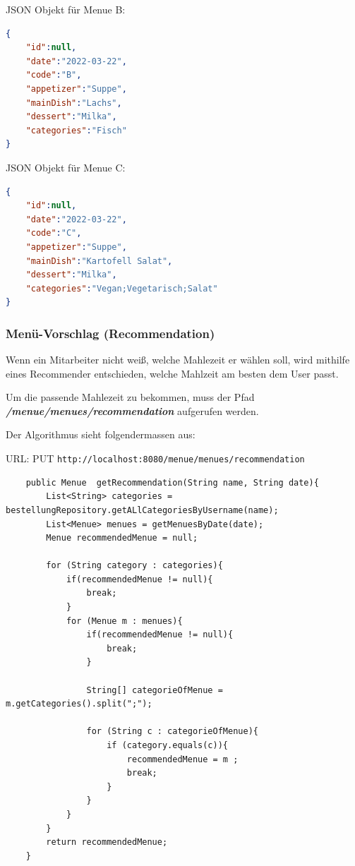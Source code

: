 JSON Objekt für Menue B:

\begin{lstlisting}[language=json,firstnumber=1]
{
    "id":null,
    "date":"2022-03-22",
    "code":"B",
    "appetizer":"Suppe",
    "mainDish":"Lachs",
    "dessert":"Milka",
    "categories":"Fisch"
}
\end{lstlisting}

JSON Objekt für Menue C:

\begin{lstlisting}[language=json,firstnumber=1]
{
    "id":null,
    "date":"2022-03-22",
    "code":"C",
    "appetizer":"Suppe",
    "mainDish":"Kartofell Salat",
    "dessert":"Milka",
    "categories":"Vegan;Vegetarisch;Salat"
}
\end{lstlisting}


\subsubsection{Menü-Vorschlag (Recommendation)}

Wenn ein Mitarbeiter nicht weiß, welche Mahlezeit er wählen soll, wird mithilfe eines Recommender entschieden, welche Mahlzeit am besten dem 
User passt.  

Um die passende Mahlezeit zu bekommen, muss der Pfad \textbf{\textit{/menue/menues/recommendation}} aufgerufen werden.

Der Algorithmus sieht folgendermassen aus:

URL: PUT \colorbox{white}{\lstinline[basicstyle=\ttfamily\color{black},language=html]|http://localhost:8080/menue/menues/recommendation|}

\begin{lstlisting}
    public Menue  getRecommendation(String name, String date){
        List<String> categories = bestellungRepository.getALlCategoriesByUsername(name);
        List<Menue> menues = getMenuesByDate(date);
        Menue recommendedMenue = null;

        for (String category : categories){
            if(recommendedMenue != null){
                break;
            }
            for (Menue m : menues){
                if(recommendedMenue != null){
                    break;
                }

                String[] categorieOfMenue = m.getCategories().split(";");

                for (String c : categorieOfMenue){
                    if (category.equals(c)){
                        recommendedMenue = m ;
                        break;
                    }
                }
            }
        }
        return recommendedMenue;
    }
\end{lstlisting}

